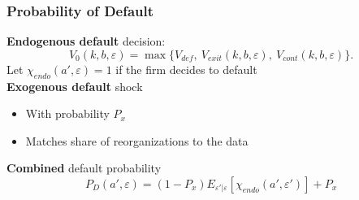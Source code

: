 \documentclass[aspectratio=169,xcolor=table]{beamer}
\begin{document}
\begin{frame}[label=Default] \frametitle{Probability of Default \hfill \hyperlink{LiqReorg}{}}
\textbf{Endogenous default} decision:
\begin{equation*} \label{eq:default decision}
    V_0(k,b,\varepsilon) = \max \{V_{def}, \  V_{exit}(k,b,\varepsilon),  \ V_{cont}(k,b,\varepsilon) \}.
\end{equation*}
Let $\chi_{endo}(a', \varepsilon) = 1$ if the firm decides to default \vspace{3mm} \\

\textbf{Exogenous default} shock 
\begin{itemize} \small
    \item With probability $P_{x}$
    \item Matches share of reorganizations to the data
\end{itemize} \normalsize

\textbf{Combined} default probability 
$$  P_D(a', \varepsilon) = (1-P_x)E_{\varepsilon'|\varepsilon}[\chi_{endo}(a',\varepsilon')] + P_{x}  $$


\end{frame}
\end{document}
